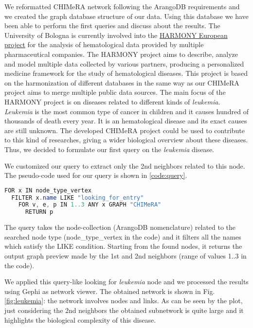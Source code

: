 \documentclass{standalone}
\begin{document}
We reformatted \textsf{CHIMeRA} network following the \textsf{ArangoDB} requirements and we created the graph database structure of our data.
Using this database we have been able to perform the first queries and discuss about the results.
The University of Bologna is currently involved into the \href{https://www.harmony-alliance.eu/}{HARMONY European project} for the analysis of hematological data provided by multiple pharmaceutical companies.
The HARMONY project aims to describe, analyze and model multiple data collected by various partners, producing a personalized medicine framework for the study of hematological diseases.
This project is based on the harmonization of different databases in the same way as our \textsf{CHIMeRA} project aims to merge multiple public data sources.
The main focus of the HARMONY project is on diseases related to different kinds of \emph{leukemia}.
\emph{Leukemia} is the most common type of cancer in children and it causes hundred of thousands of death every year.
It is an hematological disease and its exact causes are still unknown.
The developed \textsf{CHIMeRA} project could be used to contribute to this kind of researches, giving a wider biological overview about these diseases.
Thus, we decided to formulate our first query on the \emph{leukemia} disease.

We customized our query to extract only the 2nd neighbors related to this node.
The pseudo-code used for our query is shown in \ref{code:query}.

\lstset{style=Java}
\begin{lstlisting}[language=Java, caption=CHIMeRA 2nd neighbors query, label=code:query]
FOR x IN node_type_vertex
  FILTER x.name LIKE "looking_for_entry"
    FOR v, e, p IN 1..3 ANY x GRAPH "CHIMeRA"
      RETURN p
\end{lstlisting}

The query takes the node-collection (\textsf{ArangoDB} nomenclature) related to the searched node type (\textsf{node\_type\_vertex} in the code) and it filters all the names which satisfy the \textsf{LIKE} condition.
Starting from the found nodes, it returns the output graph preview made by the 1st and 2nd neighbors (range of values \textsf{1..3} in the code).

We applied this query-like looking for \emph{leukemia} node and we processed the results using \textsf{Gephi} as network viewer.
The obtained network is shown in Fig.\ref{fig:leukemia}: the network involves  nodes and  links.
As can be seen by the plot, just considering the 2nd neighbors the obtained subnetwork is quite large and it highlights the biological complexity of this disease.
\end{document}
